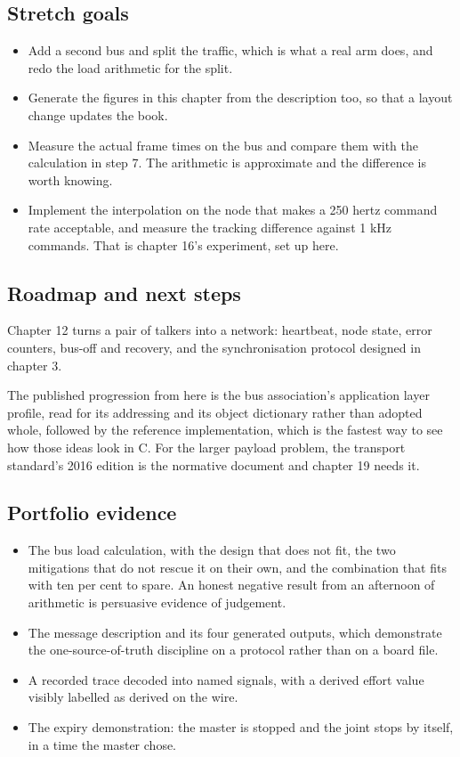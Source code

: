 \subsection*{Stretch goals}

\begin{itemize}
\item Add a second bus and split the traffic, which is what a real arm does, and
redo the load arithmetic for the split.
\item Generate the figures in this chapter from the description too, so that a
layout change updates the book.
\item Measure the actual frame times on the bus and compare them with the
calculation in step 7. The arithmetic is approximate and the difference is worth
knowing.
\item Implement the interpolation on the node that makes a 250 hertz command
rate acceptable, and measure the tracking difference against 1 kHz commands.
That is chapter 16's experiment, set up here.
\end{itemize}

\subsection*{Roadmap and next steps}

Chapter 12 turns a pair of talkers into a network: heartbeat, node state,
error counters, bus-off and recovery, and the synchronisation protocol designed
in chapter 3.

The published progression from here is the bus association's application layer
profile, read for its addressing and its object dictionary rather than adopted
whole, followed by the reference implementation, which is the fastest way to see
how those ideas look in C. For the larger payload problem, the transport
standard's 2016 edition is the normative document and chapter 19 needs it.

\subsection*{Portfolio evidence}

\begin{itemize}
\item The bus load calculation, with the design that does not fit, the two
mitigations that do not rescue it on their own, and the combination that fits
with ten per cent to spare. An honest negative result from an afternoon of
arithmetic is persuasive evidence of judgement.
\item The message description and its four generated outputs, which demonstrate
the one-source-of-truth discipline on a protocol rather than on a board file.
\item A recorded trace decoded into named signals, with a derived effort value
visibly labelled as derived on the wire.
\item The expiry demonstration: the master is stopped and the joint stops by
itself, in a time the master chose.
\end{itemize}

